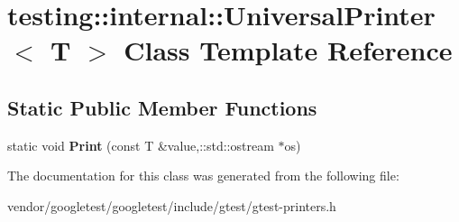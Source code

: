 \hypertarget{classtesting_1_1internal_1_1UniversalPrinter}{}\section{testing\+:\+:internal\+:\+:Universal\+Printer$<$ T $>$ Class Template Reference}
\label{classtesting_1_1internal_1_1UniversalPrinter}
\subsection*{Static Public Member Functions}
\begin{DoxyCompactItemize}
\item 
static void {\bfseries Print} (const T \&value,\+::std\+::ostream $\ast$os)\hypertarget{classtesting_1_1internal_1_1UniversalPrinter_a6a7d29444412467c14931bc55a046138}{}\label{classtesting_1_1internal_1_1UniversalPrinter_a6a7d29444412467c14931bc55a046138}

\end{DoxyCompactItemize}


The documentation for this class was generated from the following file\+:\begin{DoxyCompactItemize}
\item 
vendor/googletest/googletest/include/gtest/gtest-\/printers.\+h\end{DoxyCompactItemize}
